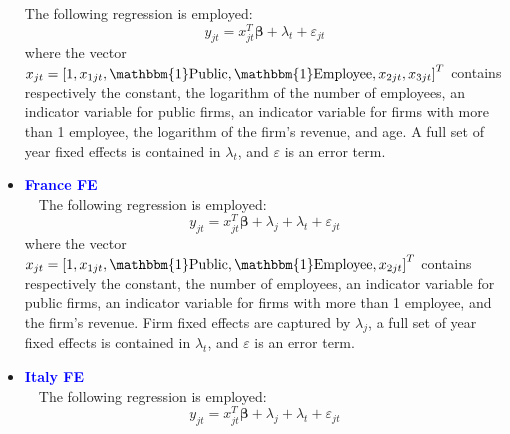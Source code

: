 \documentclass[12pt,notitlepage]{article}
\newcommand{\sym}[1] {\ifmmode^{#1} \else\(^{#1}\) \fi}
\begin{document}
\begin{itemize}
The following regression is employed:
	\begin{equation}
	y_{jt} = x^{T}_{jt}\mathbf{\beta} + \lambda_{t} + \varepsilon_{jt}
	\end{equation}
where the vector $x_{jt} = \left[  1, x_{1jt}, \mathbbm{1}\text{Public}, \mathbbm{1}\text{Employee}, x_{2jt}, x_{3jt}  \right]^{T} $ contains respectively the constant, the logarithm of the number of employees, an indicator variable for public firms, an indicator variable for firms with more than 1 employee, the logarithm of the firm's revenue, and age. A full set of year fixed effects is contained in $\lambda_{t}$, and $\varepsilon$ is an error term.
\begin{table}[htbp]\centering
\def\sym#1{\ifmmode^{#1}\else\(^{#1}\)\fi}
\caption{Haltiwanger growth rate}
\end{table}
\clearpage
\item \textcolor{blue}{\textbf{France FE}}\\~\
The following regression is employed:
	\begin{equation}
	y_{jt} = x^{T}_{jt}\mathbf{\beta} + \lambda_{j}  + \lambda_{t} + \varepsilon_{jt}
	\end{equation}
where the vector $x_{jt} = \left[  1, x_{1jt}, \mathbbm{1}\text{Public}, \mathbbm{1}\text{Employee}, x_{2jt} \right]^{T} $ contains respectively the constant, the number of employees, an indicator variable for public firms, an indicator variable for firms with more than 1 employee, and the firm's revenue. Firm fixed effects are captured by $\lambda_{j}$, a full set of year fixed effects is contained in $\lambda_{t}$, and $\varepsilon$ is an error term.
\begin{table}[htbp]\centering
\def\sym#1{\ifmmode^{#1}\else\(^{#1}\)\fi}
\caption{Haltiwanger growth rate}
\end{table}
\clearpage
\item \textcolor{blue}{\textbf{Italy FE}}\\~\
The following regression is employed:
	\begin{equation}
	y_{jt} = x^{T}_{jt}\mathbf{\beta} + \lambda_{j}  + \lambda_{t} + \varepsilon_{jt}

\end{equation}
\end{itemize}
\end{document}

